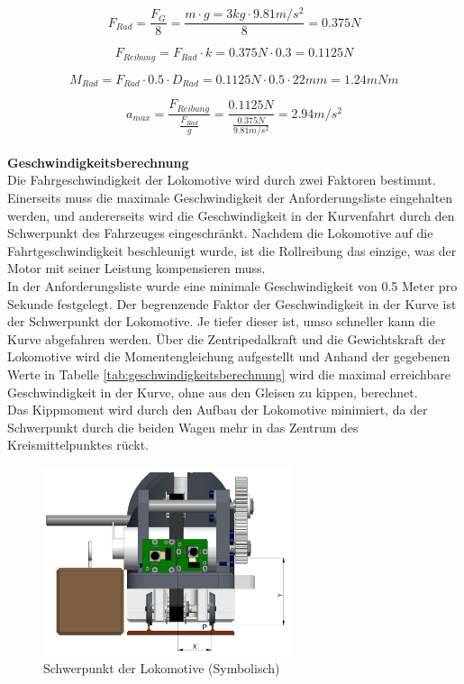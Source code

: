\documentclass[../../main.tex]{subfiles}
\begin{document}
    $$F_{Rad}=\frac{F_{G}}{8}=\frac{m \cdot g=3kg \cdot 9.81m/s^2}{8}=0.375N$$

    $$F_{Reibung}=F_{Rad} \cdot k=0.375N \cdot 0.3=0.1125N$$

    $$M_{Rad}=F_{Rad} \cdot 0.5 \cdot D_{Rad}= 0.1125N \cdot 0.5 \cdot 22mm = 1.24mNm$$

    $$a_{max}=\frac{F_{Reibung}}{\frac{F_{Rad}}{g}}=\frac{0.1125N}{\frac{0.375N}{9.81m/s^2}}=2.94m/s^2$$
    \\

    \label{GeschwindigkeitsberechnungFahrwerk}
    \textbf{Geschwindigkeitsberechnung}\\
    Die Fahrgeschwindigkeit der Lokomotive wird durch zwei Faktoren bestimmt. Einerseits muss die maximale Geschwindigkeit der Anforderungsliste eingehalten werden, und andererseits wird die Geschwindigkeit in der Kurvenfahrt durch den Schwerpunkt des Fahrzeuges eingeschränkt. Nachdem die Lokomotive auf die Fahrtgeschwindigkeit beschleunigt wurde, ist die Rollreibung das einzige, was der Motor mit seiner Leistung kompensieren muss.\\

    In der Anforderungsliste wurde eine minimale Geschwindigkeit von 0.5 Meter pro Sekunde festgelegt. Der begrenzende Faktor der Geschwindigkeit in der Kurve ist der Schwerpunkt der Lokomotive. Je tiefer dieser ist, umso schneller kann die Kurve abgefahren werden. Über die Zentripedalkraft und die Gewichtskraft der Lokomotive wird die Momentengleichung aufgestellt und Anhand der gegebenen Werte in Tabelle \ref{tab:geschwindigkeitsberechnung} wird die maximal erreichbare Geschwindigkeit in der Kurve, ohne aus den Gleisen zu kippen, berechnet.\\

    Das Kippmoment wird durch den Aufbau der Lokomotive minimiert, da der Schwerpunkt durch die beiden Wagen mehr in das Zentrum des Kreismittelpunktes rückt.\\

    \begin{figure}[H] %
        \centering
        \includegraphics[width=0.65\textwidth]{schwerpunkt.png}
        \caption{Schwerpunkt der Lokomotive (Symbolisch)}
        \label{fig:schwerpunkt}
    \end{figure}
\end{document}
